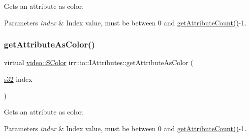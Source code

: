 Gets an attribute as color. 


\begin{DoxyParams}{Parameters}
{\em index} & Index value, must be between 0 and \hyperlink{classirr_1_1io_1_1IAttributes_a796bdd9440ee7ba0b6742a90a82870b6}{get\+Attribute\+Count()}-\/1. \\
\hline
\end{DoxyParams}
\mbox{\label{classirr_1_1io_1_1IAttributes_ac3ef831227f7c9383e3e9144ae877c60}} 
\subsubsection{\texorpdfstring{get\+Attribute\+As\+Color()}{getAttributeAsColor()}\hspace{0.1cm}{\footnotesize\ttfamily [4/4]}}
{\footnotesize\ttfamily virtual \hyperlink{classirr_1_1video_1_1SColor}{video\+::\+S\+Color} irr\+::io\+::\+I\+Attributes\+::get\+Attribute\+As\+Color (\begin{DoxyParamCaption}\item[{\hyperlink{namespaceirr_ac66849b7a6ed16e30ebede579f9b47c6}{s32}}]{index }\end{DoxyParamCaption})\hspace{0.3cm}{\ttfamily [pure virtual]}}



Gets an attribute as color. 


\begin{DoxyParams}{Parameters}
{\em index} & Index value, must be between 0 and \hyperlink{classirr_1_1io_1_1IAttributes_a796bdd9440ee7ba0b6742a90a82870b6}{get\+Attribute\+Count()}-\/1. \\
\hline
\end{DoxyParams}
\mbox{\label{classirr_1_1io_1_1IAttributes_ac072aeae816dd06e196eafb910511d2b}} 
